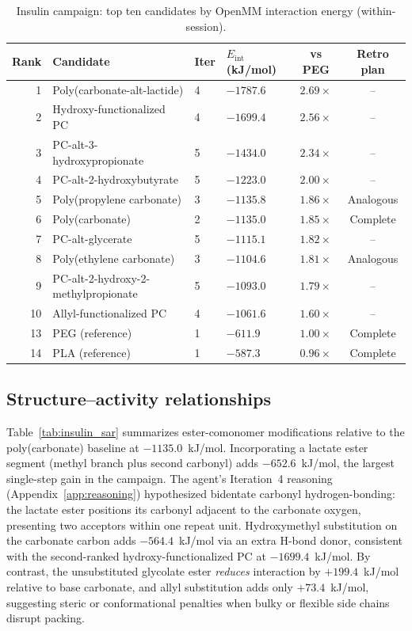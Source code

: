 \documentclass[twocolumn]{fairmeta}
\begin{document}
\begin{table}[t]
\centering
\caption{Insulin campaign: top ten candidates by OpenMM interaction energy (within-session).}
\label{tab:insulin_ranking}
\small
\begin{tabularx}{\textwidth}{rlXlcc}
\toprule
Rank & Candidate & Iter & $E_\text{int}$ (kJ/mol) & vs PEG & Retro plan \\
\midrule
1 & Poly(carbonate-alt-lactide) & 4 & $-1787.6$ & $2.69\times$ & -- \\
2 & Hydroxy-functionalized PC & 4 & $-1699.4$ & $2.56\times$ & -- \\
3 & PC-alt-3-hydroxypropionate & 5 & $-1434.0$ & $2.34\times$ & -- \\
4 & PC-alt-2-hydroxybutyrate & 5 & $-1223.0$ & $2.00\times$ & -- \\
5 & Poly(propylene carbonate) & 3 & $-1135.8$ & $1.86\times$ & Analogous \\
6 & Poly(carbonate) & 2 & $-1135.0$ & $1.85\times$ & Complete \\
7 & PC-alt-glycerate & 5 & $-1115.1$ & $1.82\times$ & -- \\
8 & Poly(ethylene carbonate) & 3 & $-1104.6$ & $1.81\times$ & Analogous \\
9 & PC-alt-2-hydroxy-2-methylpropionate & 5 & $-1093.0$ & $1.79\times$ & -- \\
10 & Allyl-functionalized PC & 4 & $-1061.6$ & $1.60\times$ & -- \\
13 & PEG (reference) & 1 & $-611.9$ & $1.00\times$ & Complete \\
14 & PLA (reference) & 1 & $-587.3$ & $0.96\times$ & Complete \\
\bottomrule
\end{tabularx}
\end{table}

\subsection{Structure--activity relationships}

Table~\ref{tab:insulin_sar} summarizes ester-comonomer modifications relative to the poly(carbonate) baseline at $-1135.0$~kJ/mol.
Incorporating a lactate ester segment (methyl branch plus second carbonyl) adds $-652.6$~kJ/mol, the largest single-step gain in the campaign.
The agent's Iteration~4 reasoning (Appendix~\ref{app:reasoning}) hypothesized bidentate carbonyl hydrogen-bonding: the lactate ester positions its carbonyl adjacent to the carbonate oxygen, presenting two acceptors within one repeat unit.
Hydroxymethyl substitution on the carbonate carbon adds $-564.4$~kJ/mol via an extra H-bond donor, consistent with the second-ranked hydroxy-functionalized PC at $-1699.4$~kJ/mol.
By contrast, the unsubstituted glycolate ester \emph{reduces} interaction by $+199.4$~kJ/mol relative to base carbonate, and allyl substitution adds only $+73.4$~kJ/mol, suggesting steric or conformational penalties when bulky or flexible side chains disrupt packing.
\end{document}
